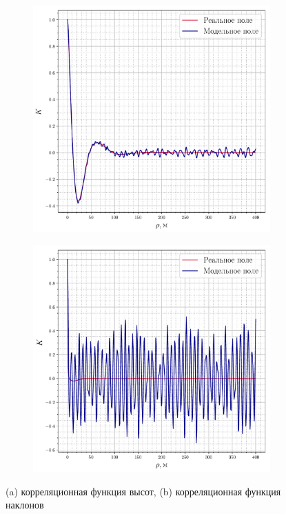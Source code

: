 \documentclass[10pt,pdf,hyperref={unicode}, dvipsnames]{beamer}
\begin{document}
\begin{frame}[t]{}
    \footnotesize
    \begin{figure}[h!]
        \centering
        \begin{subfigure}{0.49\linewidth}
            \centering
            \includegraphics[width=\linewidth]{fig/correlation_height_height2.pdf}
            \caption{}
        \end{subfigure}
        \begin{subfigure}{0.49\linewidth}
            \centering
            \includegraphics[width=\linewidth]{fig/correlation_angles_height2.pdf}
            \caption{}
        \end{subfigure}
        \caption{(a) корреляционная функция высот, (b) корреляционная функция
        наклонов}
        \label{fig:ki}
    \end{figure}


\end{frame}
\end{document}
